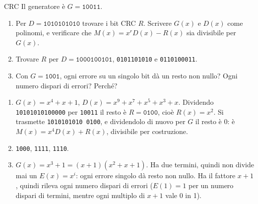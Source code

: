 \begin{esercizio}{CRC}
Il generatore è $G = \texttt{10011}$.
\begin{enumerate}[label=(\alph*)]
    \item Per $D = \texttt{1010101010}$ trovare i bit CRC $R$. Scrivere $G(x)$ e $D(x)$ come polinomi, e verificare che $M(x) = x^r D(x) -
          R(x)$ sia divisibile per $G(x)$.
    \item Trovare $R$ per $D = \texttt{1000100101}$, \texttt{0101101010} e \texttt{0110100011}.
    \item Con $G = \texttt{1001}$, ogni errore su un singolo bit dà un resto non nullo? Ogni numero dispari di errori? Perché?
\end{enumerate}

\svolgimento
\begin{enumerate}[label=(\alph*)]
    \item $G(x) = x^4 + x + 1$, $D(x) = x^9 + x^7 + x^5 + x^3 + x$. Dividendo \texttt{10101010100000} per \texttt{10011} il resto è
          $R = \texttt{0100}$, cioè $R(x) = x^2$. Si trasmette \texttt{1010101010\,0100}, e dividendolo di nuovo per $G$ il resto è 0: è
          $M(x) = x^4 D(x) + R(x)$, divisibile per costruzione.
    \item \texttt{1000}, \texttt{1111}, \texttt{1110}.
    \item $G(x) = x^3 + 1 = (x + 1)(x^2 + x + 1)$. Ha due termini, quindi non divide mai un $E(x) = x^i$: ogni errore singolo dà resto non
          nullo. Ha il fattore $x + 1$, quindi rileva ogni numero dispari di errori ($E(1) = 1$ per un numero dispari di termini, mentre ogni
          multiplo di $x + 1$ vale 0 in 1).
\end{enumerate}
\end{esercizio}

